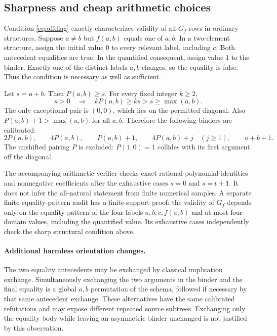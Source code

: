 \subsection{Sharpness and cheap arithmetic choices}

Condition \eqref{eq:offdiag} exactly characterizes validity of all $G_f$
rows in ordinary structures. Suppose $a\ne b$ but $f(a,b)$ equals one of
$a,b$. In a two-element structure, assign the initial value $0$ to every
relevant label, including $c$. Both antecedent equalities are true. In the
quantified consequent, assign value $1$ to the binder. Exactly one of the
distinct labels $a,b$ changes, so the equality is false. Thus the condition
is necessary as well as sufficient.

Let $s=a+b$. Then $P(a,b)\ge s$. For every fixed integer $k\ge2$,
\[
 s>0\quad\Longrightarrow\quad kP(a,b)\ge ks>s\ge\max(a,b).
\]
The only exceptional pair is $(0,0)$, which lies on the permitted diagonal.
Also $P(a,b)+1>\max(a,b)$ for all $a,b$. Therefore the following binders
are calibrated:
\[
 2P(a,b),\qquad 4P(a,b),\qquad P(a,b)+1,\qquad
 4P(a,b)+j\quad(j\ge1),\qquad a+b+1.
\]
The unshifted pairing $P$ is excluded: $P(1,0)=1$ collides with its first
argument off the diagonal.

The accompanying arithmetic verifier checks exact rational-polynomial
identities and nonnegative coefficients after the exhaustive cases
$s=0$ and $s=t+1$. It does not infer the all-natural statement from
finite numerical samples. A separate finite equality-pattern audit has
a finite-support proof: the validity of $G_f$ depends only on the equality
pattern of the four labels $a,b,c,f(a,b)$ and at most four domain values,
including the quantified value. Its exhaustive cases independently check
the sharp structural condition above.

\paragraph{Additional harmless orientation changes.}
The two equality antecedents may be exchanged by classical implication
exchange. Simultaneously exchanging the two arguments in the binder
and the final equality is a global $a,b$ permutation of the schema,
followed if necessary by that same antecedent exchange. These alternatives
have the same calibrated refutations and may expose different repeated
source subtrees. Exchanging only the equality body while leaving an
asymmetric binder unchanged is not justified by this observation.

